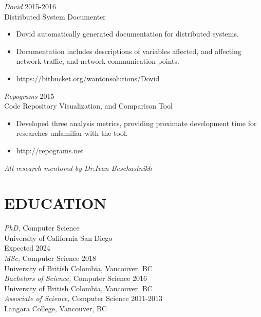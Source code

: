 \documentclass[line,margin]{res}
\begin{document}
\begin{resume}
{\sl Dovid} \hfill 2015-2016\\
    Distributed System Documenter
\begin{itemize} \itemsep -2pt
        \item Dovid automatically generated documentation for distributed systems.
        \item Documentation includes descriptions of variables affected, and affecting network traffic, and network communication points.
        \item https://bitbucket.org/wantonsolutions/Dovid
\end{itemize}

{\sl Repograms} \hfill 2015\\
	Code Repository Visualization, and Comparison Tool
\begin{itemize} \itemsep -2pt
        \item Developed three analysis metrics, providing proximate development time for researches unfamiliar with the tool.
		\item http://repograms.net
\end{itemize}

{\sl \textit{All research mentored by Dr.Ivan Beschastnikh}}\\



\section{EDUCATION}
{\sl PhD,} Computer Science \\
University of California San Diego \\
Expected 2024 \\

{\sl MSc,} Computer Science \hfill 2018 \\
University of British Colombia, Vancouver, BC \\

{\sl Bachelors of Science,} Computer Science	\hfill 2016\\
University of British Colombia, Vancouver, BC \\

{\sl Associate of Science,} Computer Science \hfill 2011-2013\\
Langara College, Vancouver, BC\\



\end{resume}
\end{document}
